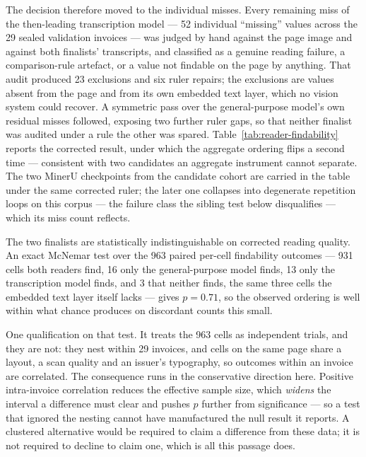 The decision therefore moved to the individual misses. Every remaining miss of the
then-leading transcription model --- 52 individual ``missing'' values across the 29 sealed
validation invoices --- was judged by hand against the page image and against both finalists'
transcripts, and classified as a genuine reading failure, a comparison-rule artefact, or a
value not findable on the page by anything. That audit produced 23 exclusions and six ruler
repairs; the exclusions are values absent from the page and from its own embedded text
layer, which no vision system could recover. A symmetric pass over the general-purpose model's own
residual misses followed, exposing two further ruler gaps, so that neither finalist was
audited under a rule the other was spared.
Table~\ref{tab:reader-findability} reports the corrected result, under which the aggregate
ordering flips a second time --- consistent with two candidates an aggregate instrument
cannot separate. The two MinerU checkpoints from the candidate cohort are carried in the
table under the same corrected ruler; the later one collapses into degenerate repetition
loops on this corpus --- the failure class the sibling test below disqualifies --- which its
miss count reflects.



The two finalists are statistically indistinguishable on corrected reading quality. An exact
McNemar test over the 963 paired per-cell findability outcomes --- 931 cells both readers
find, 16 only the general-purpose model finds, 13 only the transcription model finds, and
3 that neither finds, the same three cells the embedded text layer itself lacks ---
gives $p = 0.71$, so the observed ordering is well within what chance produces on discordant
counts this small.

One qualification on that test. It treats the 963 cells as independent trials, and they are
not: they nest within 29 invoices, and cells on the same page share a layout, a scan quality
and an issuer's typography, so outcomes within an invoice are correlated. The consequence runs
in the conservative direction here. Positive intra-invoice correlation reduces the effective
sample size, which \emph{widens} the interval a difference must clear and pushes $p$ further
from significance --- so a test that ignored the nesting cannot have manufactured the
null result it reports. A clustered alternative would be required to claim a difference from
these data; it is not required to decline to claim one, which is all this passage does.

